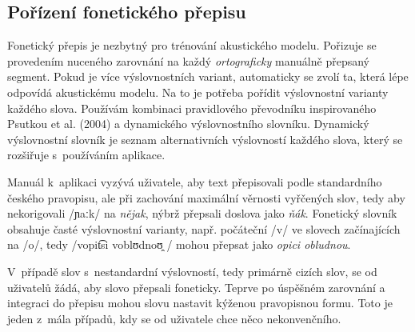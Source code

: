 \subsection{Pořízení fonetického přepisu}
\label{ssec:porizeni-fonetickeho-prepisu}

Fonetický přepis je nezbytný pro trénování akustického modelu. Pořizuje se
provedením nuceného zarovnání na každý {\em ortograficky} manuálně přepsaný segment. Pokud je více
výslovnostních variant, automaticky se zvolí ta, která lépe odpovídá akustickému
modelu. Na to je potřeba pořídit výslovnostní varianty každého slova. Používám
kombinaci pravidlového převodníku inspirovaného Psutkou et
al. (2004)\cite{psutka2004development} a dynamického výslovnostního slovníku. Dynamický
výslovnostní slovník je seznam alternativních výslovností každého slova, který
se rozšiřuje s~používáním aplikace.

Manuál k~aplikaci vyzývá uživatele, aby text přepisovali podle standardního
českého pravopisu, ale při zachování maximální věrnosti vyřčených slov, tedy aby
nekorigovali  /ɲaːk/ \normalfont na {\em nějak}, nýbrž
přepsali doslova jako {\em ňák}. Fonetický slovník obsahuje časté výslovnostní
varianty, např. počáteční  /v/ \normalfont ve slovech
začínajících na  /o/\normalfont, tedy 
/vopit͡si  voblʊdnoʊ̯ /   \normalfont mohou přepsat jako {\em opici obludnou}.

V~případě slov s~nestandardní výslovností, tedy primárně cizích slov, se od
uživatelů žádá, aby slovo přepsali foneticky. Teprve po úspěšném zarovnání a
integraci do přepisu mohou slovu nastavit kýženou pravopisnou formu. Toto je
jeden z~mála případů, kdy se od uživatele chce něco nekonvenčního.


